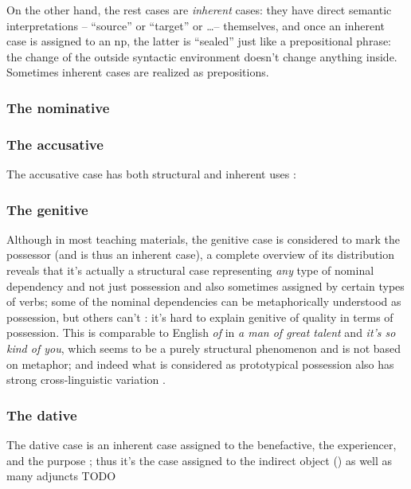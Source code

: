 \documentclass[a4paper, oneside, 12pt]{report}
\newcommand*{\citepage}[1]{p.~{#1}}
\newcommand*{\citepages}[1]{pp.~{#1}}
\newcommand{\form}[1]{\emph{#1}}
\begin{document}
On the other hand, the rest cases are \emph{inherent} cases:
they have direct semantic interpretations
-- ``source'' or ``target'' or \dots -- themselves,
and once an inherent case is assigned to an \acs{np},
the latter is ``sealed'' just like a prepositional phrase:
the change of the outside syntactic environment 
doesn't change anything inside.
Sometimes inherent cases are realized as prepositions.

\subsubsection{The nominative}

\subsubsection{The accusative}\label{sec:accusative-distribution}

The accusative case has both structural and inherent uses
\citep[\citepage{238}]{oniga2014latin}: 

\subsubsection{The genitive}\label{sec:genitive-distribution}

Although in most teaching materials, the genitive case is considered 
to mark the possessor (and is thus an inherent case), 
a complete overview of its distribution reveals that 
it's actually a structural case 
representing \emph{any} type of nominal dependency 
and not just possession 
and also sometimes assigned by certain types of verbs;
some of the nominal dependencies can be 
metaphorically understood as possession, 
but others can't \citep[\citepage{244}]{oniga2014latin}:
it's hard to explain genitive of quality 
in terms of possession.
This is comparable to English \form{of}
in \form{a man of great talent} and \form{it's so kind of you},
which seems to be a purely structural phenomenon
and is not based on metaphor;
and indeed what is considered as prototypical possession 
also has strong cross-linguistic variation 
\citep[\citepages{262-263}]{dixon2010basic2}.

\subsubsection{The dative}\label{sec:dative-distribution}

The dative case is an inherent case assigned to the benefactive, the experiencer, and the purpose
\citep[\citepage{251}]{oniga2014latin};
thus it's the case assigned to the indirect object ()
as well as many adjuncts TODO
\end{document}
